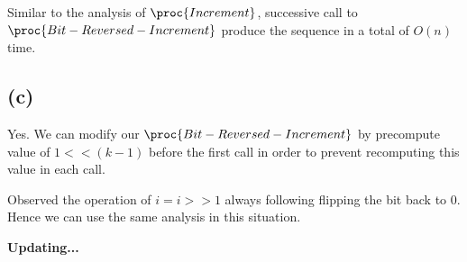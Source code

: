 Similar to the analysis of $\proc{Increment}$,
successive call to $\proc{Bit-Reversed-Increment}$
produce the sequence in a total of $O(n)$ time.

\subsection*{(c)}

Yes.
We can modify our $\proc{Bit-Reversed-Increment}$
by precompute value of $1 << (k - 1)$ before the first call
in order to prevent recomputing this value in each call. 

Observed the operation of $i = i >> 1$ always following 
flipping the bit back to $0$.
Hence we can use the same analysis in this situation.

\centerline{\textbf{Updating...}}

